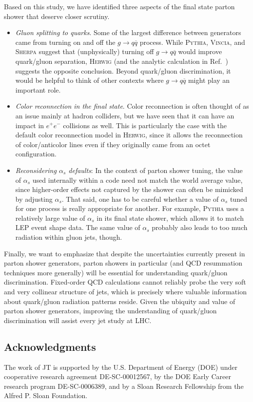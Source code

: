 \documentclass[11pt]{cernrep}
\begin{document}
Based on this study, we have identified three aspects of the final state parton shower that deserve closer scrutiny.
\begin{itemize}
\item \textit{Gluon splitting to quarks}.  Some of the largest difference between generators came from turning on and off the $g \to q \overline{q}$ process.  While \textsc{Pythia}, \textsc{Vincia}, and \textsc{Sherpa} suggest that (unphysically) turning off $g \to q \overline{q}$ would improve quark/gluon separation, \textsc{Herwig} (and the analytic calculation in Ref.~\cite{Larkoski:2013eya}) suggests the opposite conclusion.  Beyond quark/gluon discrimination, it would be helpful to think of other contexts where $g \to q \overline{q}$ might play an important role.
\item \textit{Color reconnection in the final state}.  Color reconnection is often thought of as an issue mainly at hadron colliders, but we have seen that it can have an impact in $e^+ e^-$ collisions as well.  This is particularly the case with the default color reconnection model in \textsc{Herwig}, since it allows the reconnection of color/anticolor lines even if they originally came from an octet configuration.
\item \textit{Reconsidering $\alpha_s$ defaults}:  In the context of parton shower tuning, the value of $\alpha_s$ used internally within a code need not match the world average value, since higher-order effects not captured by the shower can often be mimicked by adjusting $\alpha_s$.  That said, one has to be careful whether a value of $\alpha_s$ tuned for one process is really appropriate for another.  For example, \textsc{Pythia} uses a relatively large value of $\alpha_s$ in its final state shower, which allows it to match LEP event shape data.  The same value of $\alpha_s$ probably also leads to too much radiation within gluon jets, though.
\end{itemize}
Finally, we want to emphasize that despite the uncertainties currently present in parton shower generators, parton showers in particular (and QCD resummation techniques more generally) will be essential for understanding quark/gluon discrimination.  Fixed-order QCD calculations cannot reliably probe the very soft and very collinear structure of jets, which is precisely where valuable information about quark/gluon radiation patterns reside.  Given the ubiquity and value of parton shower generators, improving the understanding of quark/gluon discrimination will assist every jet study at LHC.

\subsection*{Acknowledgments}

The work of JT is supported by the U.S. Department of Energy (DOE) under cooperative research agreement DE-SC-00012567, by the DOE Early Career research program DE-SC-0006389, and by a Sloan Research Fellowship from the Alfred P. Sloan Foundation.


\end{document}
